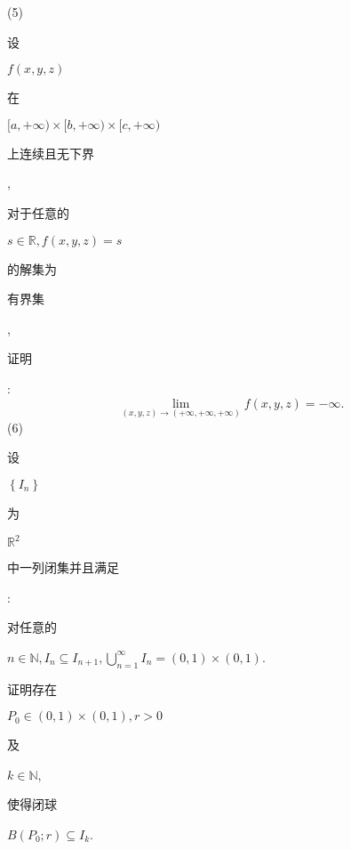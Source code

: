 \documentclass[10pt]{article}
\begin{document}
(5) \begin{CJK}{UTF8}{mj}设\end{CJK} $f(x, y, z)$ \begin{CJK}{UTF8}{mj}在\end{CJK} $[a,+\infty) \times[b,+\infty) \times[c,+\infty)$ \begin{CJK}{UTF8}{mj}上连续且无下界\end{CJK}, \begin{CJK}{UTF8}{mj}对于任意的\end{CJK} $s \in \mathbb{R}, f(x, y, z)=s$ \begin{CJK}{UTF8}{mj}的解集为\end{CJK} \begin{CJK}{UTF8}{mj}有界集\end{CJK}, \begin{CJK}{UTF8}{mj}证明\end{CJK}:
$$
\lim _{(x, y, z) \rightarrow(+\infty,+\infty,+\infty)} f(x, y, z)=-\infty .
$$
(6) \begin{CJK}{UTF8}{mj}设\end{CJK} $\left\{I_{n}\right\}$ \begin{CJK}{UTF8}{mj}为\end{CJK} $\mathbb{R}^{2}$ \begin{CJK}{UTF8}{mj}中一列闭集并且满足\end{CJK}: \begin{CJK}{UTF8}{mj}对任意的\end{CJK} $n \in \mathbb{N}, I_{n} \subseteq I_{n+1}, \bigcup_{n=1}^{\infty} I_{n}=(0,1) \times(0,1)$. \begin{CJK}{UTF8}{mj}证明存在\end{CJK} $P_{0} \in(0,1) \times(0,1), r>0$ \begin{CJK}{UTF8}{mj}及\end{CJK} $k \in \mathbb{N}$, \begin{CJK}{UTF8}{mj}使得闭球\end{CJK} $B\left(P_{0} ; r\right) \subseteq I_{k}$.
\end{document}
